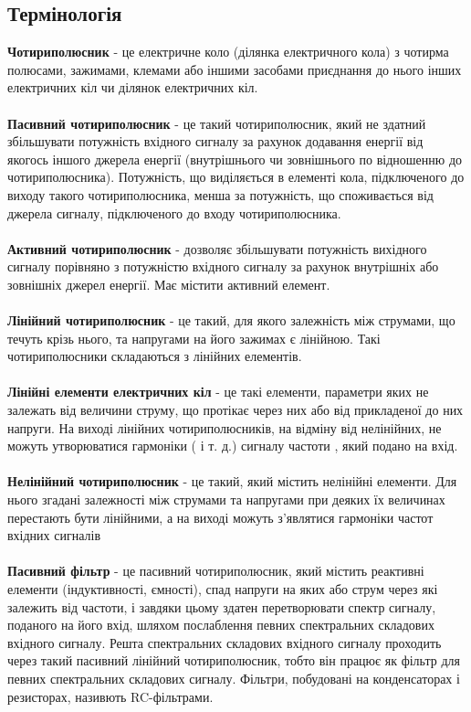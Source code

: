 \subsection{Термінологія}
\indent \textbf{Чотириполюсник} - це електричне коло (ділянка електричного кола) з чотирма
полюсами, зажимами, клемами або іншими засобами приєднання до нього інших електричних кіл чи ділянок електричних кіл. \\~\\
\textbf{Пасивний чотириполюсник} - це такий чотириполюсник, який не здатний збільшувати потужність вхідного сигналу за рахунок додавання енергії від якогось іншого джерела енергії (внутрішнього чи зовнішнього по відношенню до чотириполюсника). Потужність, що виділяється в елементі кола, підключеного до виходу такого чотириполюсника, менша за потужність, що споживається від джерела сигналу, підключеного до входу чотириполюсника.\\~\\
\textbf{Активний чотириполюсник} - дозволяє збільшувати потужність вихідного сигналу порівняно з потужністю вхідного сигналу за рахунок внутрішніх або зовнішніх
джерел енергії. Має містити активний елемент.\\~\\
\textbf{Лінійний чотириполюсник} - це такий, для якого залежність між струмами, що течуть крізь нього, та напругами на його зажимах є лінійною. Такі чотириполюсники
складаються з лінійних елементів. \\~\\
\textbf{Лінійні елементи електричних кіл} - це такі елементи, параметри яких не залежать від величини струму, що протікає через них або від прикладеної до них напруги.
На виході лінійних чотириполюсників, на відміну від нелінійних, не можуть утворюватися гармоніки ( і т. д.) сигналу частоти , який подано на вхід.\\~\\
\textbf{Нелінійний чотириполюсник} - це такий, який містить нелінійні елементи.
Для нього згадані залежності між струмами та напругами при деяких їх величинах
перестають бути лінійними, а на виході можуть з’являтися гармоніки частот вхідних
сигналів\\~\\
\textbf{Пасивний фільтр} - це пасивний чотириполюсник, який містить реактивні
елементи (індуктивності, ємності), спад напруги на яких або струм через які залежить
від частоти, і завдяки цьому здатен перетворювати спектр сигналу, поданого на його вхід, шляхом послаблення певних спектральних складових вхідного сигналу. Решта
спектральних складових вхідного сигналу проходить через такий пасивний лінійний чотириполюсник, тобто він працює як фільтр для певних спектральних складових сигналу.
Фільтри, побудовані на конденсаторах і резисторах, називють RC-фільтрами.
\newpage
